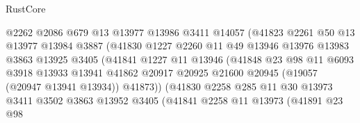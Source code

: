 \begin{lexlean}{RustCore}
\begin{coremodule}
                              @2262
                              @2086
                              @679
                              @13
                              @13977
                              @13986
                              @3411
                              @14057
                              (@41823
                                @2261
                                @50
                                @13
                                @13977
                                @13984
                                @3887
                                (@41830
                                  @1227
                                  @2260
                                  @11
                                  @49
                                  @13946
                                  @13976
                                  @13983
                                  @3863
                                  @13925
                                  @3405
                                  (@41841
                                    @1227
                                    @11
                                    @13946
                                    (@41848
                                      @23
                                      @98
                                      @11
                                      @6093
                                      @3918
                                      @13933
                                      @13941
                                      @41862
                                      @20917
                                      @20925
                                      @21600
                                      @20945
                                      (@19057 (@20947 @13941 @13934))
                                      @41873))
                                  (@41830
                                    @2258
                                    @285
                                    @11
                                    @30
                                    @13973
                                    @3411
                                    @3502
                                    @3863
                                    @13952
                                    @3405
                                    (@41841
                                      @2258
                                      @11
                                      @13973
                                      (@41891
                                        @23
                                        @98

\end{coremodule}
\end{lexlean}
